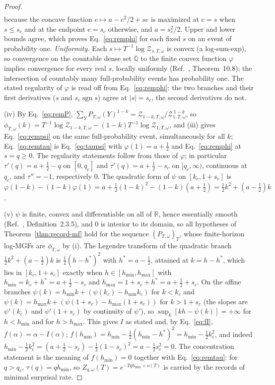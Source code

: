 \documentclass[aps,prx,reprint,superscriptaddress,nobibnotes,longbibliography]{revtex4-2}
\theoremstyle{remark}
\begin{document}
\begin{proof}
\begin{align*}
\end{align*}
because the concave function $e\mapsto a-e^2/2+se$ is maximized at $e=s$ when $s\le s_c$ and at the endpoint $e=s_c$ otherwise, and $a=s_c^2/2$.  Upper and lower bounds agree, which proves Eq.~\eqref{eq:remphi} for each fixed $s$ on an event of probability one.  \emph{Uniformity.}  Each $s\mapsto T^{-1}\log\mathcal Z_{s,T,\omega}$ is convex (a log-sum-exp), so convergence on the countable dense set $\mathbb Q$ to the finite convex function $\varphi$ implies convergence for every real $s$, locally uniformly (Ref.~\cite{Rockafellar1970}, Theorem~10.8); the intersection of countably many full-probability events has probability one.  The stated regularity of $\varphi$ is read off from Eq.~\eqref{eq:remphi}: the two branches and their first derivatives ($s$ and $s_c\operatorname{sgn}s$) agree at $|s|=s_c$, the second derivatives do not.

(iv) By Eq.~\eqref{eq:remP}, $\sum_YP_{T,\omega}(Y)^{1-k}=\mathcal Z_{1-k,T,\omega}/\mathcal Z_{1,T,\omega}^{\,1-k}$, so $\phi_{T,\omega}(k)=T^{-1}\log\mathcal Z_{1-k,T,\omega}-(1-k)T^{-1}\log\mathcal Z_{1,T,\omega}$, and (iii) gives Eq.~\eqref{eq:rempsi} on the same full-probability event, simultaneously for all $k$; Eq.~\eqref{eq:remtau} is Eq.~\eqref{eq:taupsi} with $\varphi(1)=a+\tfrac12$ and Eq.~\eqref{eq:remphi} at $s=q\ge0$.  The regularity statements follow from those of $\varphi$; in particular $\tau'(q)=a+\tfrac12-q$ on $[0,q_c]$ and $\tau'(q)=a+\tfrac12-s_c$ on $[q_c,\infty)$, continuous at $q_c$, and $\tau''=-1$, respectively $0$.  The quadratic form of $\psi$ on $[k_c,1+s_c]$ is $\varphi(1-k)-(1-k)\varphi(1)=a+\tfrac12(1-k)^2-(1-k)(a+\tfrac12)=\tfrac12k^2+(a-\tfrac12)k$.

(v) $\psi$ is finite, convex and differentiable on all of $\mathbb R$, hence essentially smooth (Ref.~\cite{DemboZeitouni1998}, Definition~2.3.5), and $0$ is interior to its domain, so all hypotheses of Theorem~\ref{thm:record-mf} hold for the sequence $(P_{T,\omega})_T$, whose finite-horizon log-MGFs are $\phi_{T,\omega}$ by (i).  The Legendre transform of the quadratic branch $\tfrac12k^2+(a-\tfrac12)k$ is $\tfrac12(h-h^*)^2$ with $h^*=a-\tfrac12$, attained at $k=h-h^*$, which lies in $[k_c,1+s_c]$ exactly when $h\in[h_{\min},h_{\max}]$ with $h_{\min}=k_c+h^*=a+\tfrac12-s_c$ and $h_{\max}=1+s_c+h^*=a+\tfrac12+s_c$.  On the affine branches $\psi(k)=h_{\min}k+(\psi(k_c)-h_{\min}k_c)$ for $k<k_c$ and $\psi(k)=h_{\max}k+(\psi(1+s_c)-h_{\max}(1+s_c))$ for $k>1+s_c$ (the slopes are $\psi'(k_c)$ and $\psi'(1+s_c)$ by continuity of $\psi'$), so $\sup_k[kh-\psi(k)]=+\infty$ for $h<h_{\min}$ and for $h>h_{\max}$.  This gives $I$ as stated and, by Eq.~\eqref{eq:fI}, $f(\alpha)=\alpha-I(\alpha)$; $f(h_{\min})=h_{\min}-\tfrac12(h_{\min}-h^*)^2=h_{\min}-\tfrac12k_c^2$, and indeed $h_{\min}-\tfrac12k_c^2=(a+\tfrac12-s_c)-\tfrac12(1-s_c)^2=a-\tfrac12s_c^2=0$.  The concentration statement is the meaning of $f(h_{\min})=0$ together with Eq.~\eqref{eq:remtau}: for $q>q_c$, $\tau(q)=qh_{\min}$, so $Z_{q,\omega}(T)=e^{-Tqh_{\min}+o(T)}$ is carried by the records of minimal surprisal rate.
\end{proof}
\end{document}
